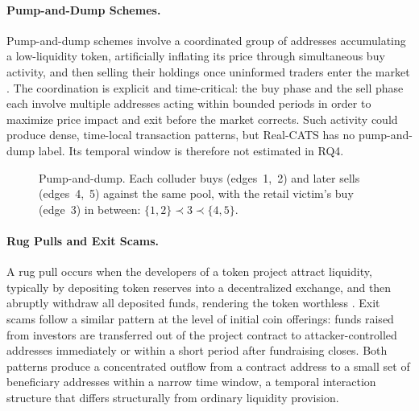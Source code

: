 \paragraph{Pump-and-Dump Schemes.}
Pump-and-dump schemes involve a coordinated group of addresses accumulating a low-liquidity token, artificially inflating its price through simultaneous buy activity, and then selling their holdings once uninformed traders enter the market \citep{li2021cryptocurrency, hornuf2025cybercrime}. The coordination is explicit and time-critical: the buy phase and the sell phase each involve multiple addresses acting within bounded periods in order to maximize price impact and exit before the market corrects. Such activity could produce dense, time-local transaction patterns, but Real-CATS has no pump-and-dump label. Its temporal window is therefore not estimated in RQ4.

\begin{figure}[ht]
  \centering
  \caption[Pump-and-dump transfer sequence]{Pump-and-dump. Each colluder buys
    (edges~1,~2) and later sells (edges~4,~5) against the same pool, with the
    retail victim's buy (edge~3) in between: $\{1,2\} \prec 3 \prec \{4,5\}$.}
  \label{fig:motif-pumpdump}
\end{figure}

\paragraph{Rug Pulls and Exit Scams.}
A rug pull occurs when the developers of a token project attract liquidity, typically by depositing token reserves into a decentralized exchange, and then abruptly withdraw all deposited funds, rendering the token worthless \citep{hornuf2025cybercrime, xia2021rugpull}. Exit scams follow a similar pattern at the level of initial coin offerings: funds raised from investors are transferred out of the project contract to attacker-controlled addresses immediately or within a short period after fundraising closes. Both patterns produce a concentrated outflow from a contract address to a small set of beneficiary addresses within a narrow time window, a temporal interaction structure that differs structurally from ordinary liquidity provision.

